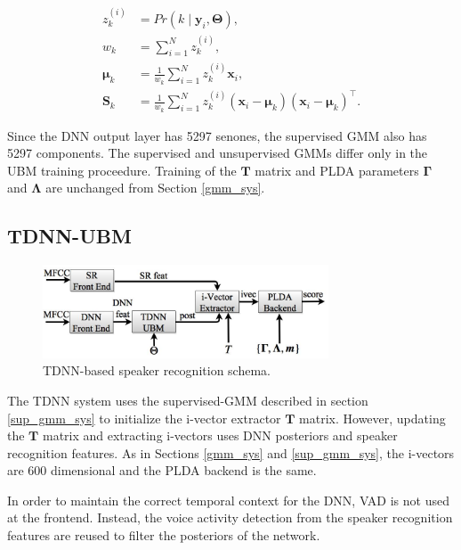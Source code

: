 \documentclass{article}
\begin{document}
\begin{equation}
\label{eq:sup_gmm_eq} 
\begin{split}
z_{k}^{(i)} &= Pr(k \mid \boldsymbol{y}_{i}, \boldsymbol{\Theta}), \\
w_{k} &= \sum_{i=1}^{N}z_{k}^{(i)},\\
\boldsymbol{\mu}_{k} &= \frac{1}{w_{k}} \sum_{i=1}^{N} z_{k}^{(i)} \boldsymbol{x}_{i},\\
\boldsymbol{S}_{k} &= \frac{1}{w_{k}} \sum_{i=1}^{N} z_{k}^{(i)} (\boldsymbol{x}_{i} - \boldsymbol{\mu}_{k}) (\boldsymbol{x}_{i} - \boldsymbol{\mu}_{k})^{\top}.
\end{split}
\end{equation}

Since the DNN output layer has 5297 senones, the supervised GMM also has 5297
components. The supervised and unsupervised GMMs differ only
in the UBM training proceedure. Training of the $\boldsymbol{T}$ matrix
and PLDA parameters $\boldsymbol{\Gamma}$ and $\boldsymbol{\Lambda}$ are unchanged from Section \ref{gmm_sys}.

\subsection{TDNN-UBM}

\begin{figure}[th]
\centerline{\includegraphics[width=8.5cm]{fig/dnn_schema}}
\caption{TDNN-based speaker recognition schema.}
\label{fig:dnn_schema}
\end{figure}

The TDNN system uses the supervised-GMM described in 
section \ref{sup_gmm_sys} to initialize the i-vector 
extractor $\boldsymbol{T}$ matrix.
However, updating the $\boldsymbol{T}$ matrix and extracting 
i-vectors uses DNN posteriors and 
speaker recognition features. As in Sections \ref{gmm_sys} and \ref{sup_gmm_sys},
 the i-vectors are 600 dimensional and the PLDA backend is the same.

In order to maintain the correct temporal context for the DNN, VAD
is not used at the frontend. Instead, the voice activity detection from the speaker recognition
features are reused to filter the posteriors of the network.
\end{document}
